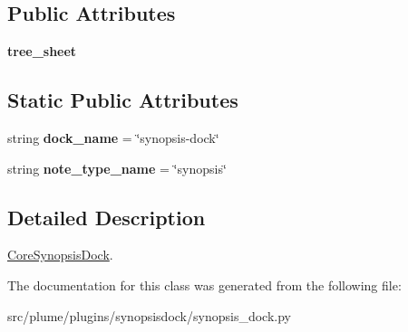 \subsection*{Public Attributes}
\begin{DoxyCompactItemize}
\item 
{\bfseries tree\+\_\+sheet}\hypertarget{classplume-creator_1_1src_1_1plume_1_1plugins_1_1synopsisdock_1_1synopsis__dock_1_1_core_synopsis_dock_a9ea5515ba1840d989644fbe4175e5e6c}{}\label{classplume-creator_1_1src_1_1plume_1_1plugins_1_1synopsisdock_1_1synopsis__dock_1_1_core_synopsis_dock_a9ea5515ba1840d989644fbe4175e5e6c}

\end{DoxyCompactItemize}
\subsection*{Static Public Attributes}
\begin{DoxyCompactItemize}
\item 
string {\bfseries dock\+\_\+name} = \char`\"{}synopsis-\/dock\char`\"{}\hypertarget{classplume-creator_1_1src_1_1plume_1_1plugins_1_1synopsisdock_1_1synopsis__dock_1_1_core_synopsis_dock_a8c78252ac0fd26ac1527f5d56760e129}{}\label{classplume-creator_1_1src_1_1plume_1_1plugins_1_1synopsisdock_1_1synopsis__dock_1_1_core_synopsis_dock_a8c78252ac0fd26ac1527f5d56760e129}

\item 
string {\bfseries note\+\_\+type\+\_\+name} = \char`\"{}synopsis\char`\"{}\hypertarget{classplume-creator_1_1src_1_1plume_1_1plugins_1_1synopsisdock_1_1synopsis__dock_1_1_core_synopsis_dock_a41f3f6dd402e187b50f9fe863ef6d766}{}\label{classplume-creator_1_1src_1_1plume_1_1plugins_1_1synopsisdock_1_1synopsis__dock_1_1_core_synopsis_dock_a41f3f6dd402e187b50f9fe863ef6d766}

\end{DoxyCompactItemize}


\subsection{Detailed Description}
\hyperlink{classplume-creator_1_1src_1_1plume_1_1plugins_1_1synopsisdock_1_1synopsis__dock_1_1_core_synopsis_dock}{Core\+Synopsis\+Dock}. 

The documentation for this class was generated from the following file\+:\begin{DoxyCompactItemize}
\item 
src/plume/plugins/synopsisdock/synopsis\+\_\+dock.\+py\end{DoxyCompactItemize}
